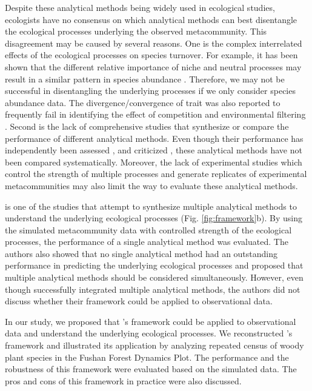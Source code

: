 	Despite these analytical methods being widely used in ecological studies, ecologists have no consensus on which analytical methods can best disentangle the ecological processes underlying the observed metacommunity. This disagreement may be caused by several reasons. One is the complex interrelated effects of the ecological processes on species turnover. For example, it has been shown that the different relative importance of niche and neutral processes may result in a similar pattern in species abundance \citep{chave2002comparing, mcgill2010towards}. Therefore, we may not be successful in disentangling the underlying processes if we only consider species abundance data. The divergence/convergence of trait was also reported to frequently fail in identifying the effect of competition and environmental filtering \citep{mayfield2010opposing}. Second is the lack of comprehensive studies that synthesize or compare the performance of different analytical methods. Even though their performance has independently been assessed \citep{mcgill2006empirical, vellend2014assessing, tucker2016differentiating, ning2019general}, and criticized \citep{smith2010variation, molina2020difficulties, brown2017making}, these analytical methods have not been compared systematically. Moreover, the lack of experimental studies which control the strength of multiple processes and generate replicates of experimental metacommunities may also limit the way to evaluate these analytical methods. 
	
	\citet{guzman2022accounting} is one of the studies that attempt to synthesize multiple analytical methods to understand the underlying ecological processes (Fig. \ref{fig:framework}b). By using the simulated metacommunity data with controlled strength of the ecological processes, the performance of a single analytical method was evaluated. The authors also showed that no single analytical method had an outstanding performance in predicting the underlying ecological processes and proposed that multiple analytical methods should be considered simultaneously. However, even though \citet{guzman2022accounting} successfully integrated multiple analytical methods, the authors did not discuss whether their framework could be applied to observational data.
	
	In our study, we proposed that \citeauthor{guzman2022accounting}'s framework could be applied to observational data and understand the underlying ecological processes. We reconstructed \citeauthor{guzman2022accounting}'s framework and illustrated its application by analyzing repeated census of woody plant species in the Fushan Forest Dynamics Plot. The performance and the robustness of this framework were evaluated based on the simulated data. The pros and cons of this framework in practice were also discussed.
	
	
	